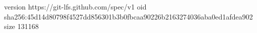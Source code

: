 version https://git-lfs.github.com/spec/v1
oid sha256:45d14d80798f4527dd856301b3b0fbcaa90226b2163274036aba0ed1afdea902
size 131168
